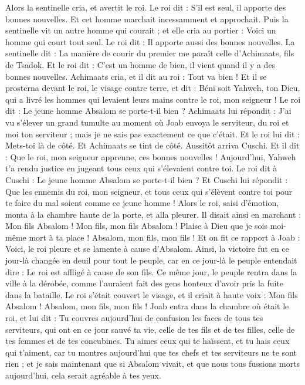 \begin{multicols}{2}
Alors la sentinelle cria, et avertit le roi. Le roi dit : S'il est seul, il apporte des bonnes nouvelles. Et cet homme marchait incessamment et approchait.
Puis la sentinelle vit un autre homme qui courait ; et elle cria au portier : Voici un homme qui court tout seul. Le roi dit : Il apporte aussi des bonnes nouvelles.
La sentinelle dit : La manière de courir du premier me paraît celle d'Achimaats, fils de Tsadok. Et le roi dit : C'est un homme de bien, il vient quand il y a des bonnes nouvelles.
Achimaats cria, et il dit au roi : Tout va bien ! Et il se prosterna devant le roi, le visage contre terre, et dit : Béni soit Yahweh, ton Dieu, qui a livré les hommes qui levaient leurs mains contre le roi, mon seigneur !
Le roi dit : Le jeune homme Absalom se porte-t-il bien ? Achimaats lui répondit : J'ai vu s’élever un grand tumulte au moment où Joab envoya le serviteur, du roi et moi ton serviteur ; mais je ne sais pas exactement ce que c'était.
Et le roi lui dit : Mets-toi là de côté. Et Achimaats se tint de côté.
Aussitôt arriva Cuschi. Et il dit : Que le roi, mon seigneur apprenne, ces bonnes nouvelles ! Aujourd'hui, Yahweh t'a rendu justice en jugeant tous ceux qui s'élevaient contre toi.
Le roi dit à Cuschi : Le jeune homme Absalom se porte-t-il bien ? Et Cuschi lui répondit : Que les ennemis du roi, mon seigneur, et tous ceux qui s’élèvent contre toi pour te faire du mal soient comme ce jeune homme !
Alors le roi, saisi d’émotion, monta à la chambre haute de la porte, et alla pleurer. Il disait ainsi en marchant : Mon fils Absalom ! Mon fils, mon fils Absalom ! Plaise à Dieu que je sois moi-même mort à ta place ! Absalom, mon fils, mon fils !
\VerseOne{}Et on fit ce rapport à Joab : Voici, le roi pleure et se lamente à cause d'Absalom.
Ainsi, la victoire fut en ce jour-là changée en deuil pour tout le peuple, car en ce jour-là le peuple entendait dire : Le roi est affligé à cause de son fils.
Ce même jour, le peuple rentra dans la ville à la dérobée, comme l'auraient fait des gens honteux d'avoir pris la fuite dans la bataille.
Le roi s’était couvert le visage, et il criait à haute voix : Mon fils Absalom ! Absalom, mon fils, mon fils !
Joab entra dans la chambre où était le roi, et lui dit : Tu couvres aujourd'hui de confusion les faces de tous tes serviteurs, qui ont en ce jour sauvé ta vie, celle de tes fils et de tes filles, celle de tes femmes et de tes concubines.
Tu aimes ceux qui te haïssent, et tu hais ceux qui t'aiment, car tu montres aujourd'hui que tes chefs et tes serviteurs ne te sont rien ; et je sais maintenant que si Absalom vivait, et que nous tous fussions morts aujourd'hui, cela serait agréable à tes yeux.

\end{multicols}
